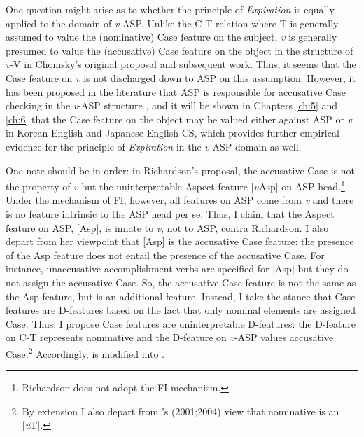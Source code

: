 One question might arise as to whether the principle of \textit{Expiration} is equally applied to the domain of \textit{v}-\ac{ASP}. Unlike the C-T relation where T is generally assumed to value the (nominative) Case feature on the subject, \textit{v} is generally presumed to value the (accusative) Case feature on the object in the structure of \textit{v}{}-V in Chomsky’s original proposal and subsequent work. Thus, it seems that the Case feature on \textit{v} is not discharged down to \ac{ASP} on this assumption. However, it has been proposed in the literature that \ac{ASP} is responsible for accusative Case checking in the \textit{v}-\ac{ASP} structure \citep{Richardson2003}, and it will be shown in Chapters \ref{ch:5} and \ref{ch:6} that the Case feature on the object may be valued either against \ac{ASP} or \textit{v} in Korean-English and Japanese-English \ac{CS}, which provides further empirical evidence for the principle of \textit{Expiration} in the \textit{v}{}-\ac{ASP} domain as well. 

One note should be in order: in Richardson’s proposal, the accusative Case is not the property of \textit{v} but the uninterpretable Aspect feature [\textit{u}Asp] on \ac{ASP} head.\footnote{Richardson does not adopt the \ac{FI} mechanism.} Under the mechanism of \ac{FI}, however, all features on \ac{ASP} come from \textit{v} and there is no feature intrinsic to the \ac{ASP} head per se. Thus, I claim that the Aspect feature on \ac{ASP}, [Asp], is innate to \textit{v}, not to \ac{ASP}, contra Richardson. I also depart from her viewpoint that [Asp] is the accusative Case feature: the presence of the Asp feature does not entail the presence of the accusative Case. For instance, unaccusative accomplishment verbs are specified for [Asp] but they do not assign the accusative Case. So, the accusative Case feature is not the same as the Asp-feature, but is an additional feature. Instead, I take the stance that Case features are D-features based on the fact that only nominal elements are assigned Case. Thus, I propose Case features are uninterpretable D-features: the D-feature on C-T represents nominative and the D-feature on \textit{v}-\ac{ASP} values accusative Case.\footnote{By extension I also depart from \citeauthor{PesetskyTorrego2001}'s (2001;2004) view that nominative is an [\textit{u}T].} Accordingly,  is modified into .


